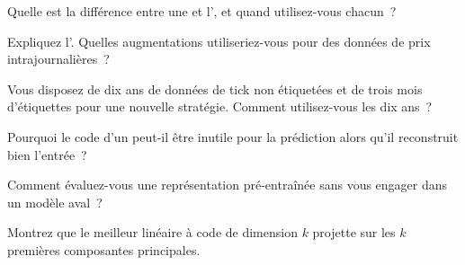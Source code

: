 \begin{interviewq}\label{iq:ml:representation-learning:1}
Quelle est la différence entre une  et l', et quand utilisez-vous chacun~?
\end{interviewq}

\begin{interviewq}\label{iq:ml:representation-learning:2}
Expliquez l'. Quelles augmentations utiliseriez-vous pour des données de prix intrajournalières~?
\end{interviewq}

\begin{interviewq}\label{iq:ml:representation-learning:3}
Vous disposez de dix ans de données de tick non étiquetées et de trois mois d'étiquettes pour une nouvelle stratégie. Comment utilisez-vous les dix ans~?
\end{interviewq}

\begin{interviewq}\label{iq:ml:representation-learning:4}
Pourquoi le code d'un  peut-il être inutile pour la prédiction alors qu'il reconstruit bien l'entrée~?
\end{interviewq}

\begin{interviewq}\label{iq:ml:representation-learning:5}
Comment évaluez-vous une représentation pré-entraînée sans vous engager dans un modèle aval~?
\end{interviewq}

\begin{interviewq}\label{iq:ml:representation-learning:6}
Montrez que le meilleur  linéaire à code de dimension $k$ projette sur les $k$ premières composantes principales.
\end{interviewq}
